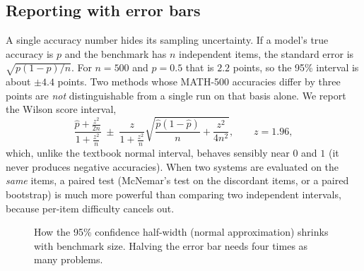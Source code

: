 \subsection{Reporting with error bars}
A single accuracy number hides its sampling uncertainty. If a model's true accuracy is $p$ and the
benchmark has $n$ independent items, the standard error is $\sqrt{p(1-p)/n}$. For $n = 500$ and
$p = 0.5$ that is $2.2$ points, so the 95\% interval is about $\pm 4.4$ points. Two methods whose
MATH-500 accuracies differ by three points are \emph{not} distinguishable from a single run on that
basis alone. We report the Wilson score interval,
\begin{equation}
  \frac{\hat p + \frac{z^2}{2n}}{1 + \frac{z^2}{n}} \;\pm\;
  \frac{z}{1 + \frac{z^2}{n}} \sqrt{\frac{\hat p (1-\hat p)}{n} + \frac{z^2}{4n^2}},
  \qquad z = 1.96,
  \label{eq:eval:wilson}
\end{equation}
which, unlike the textbook normal interval, behaves sensibly near $0$ and $1$ (it never
produces negative accuracies). When two systems are evaluated on the \emph{same} items, a paired
test (McNemar's test on the discordant items, or a paired bootstrap) is much more powerful than
comparing two independent intervals, because per-item difficulty cancels out.

\begin{figure}[t]
\centering
{}
\caption{How the 95\% confidence half-width (normal approximation) shrinks with benchmark size.
Halving the error bar needs four times as many problems.}
\label{fig:eval:errorbars}
\end{figure}


